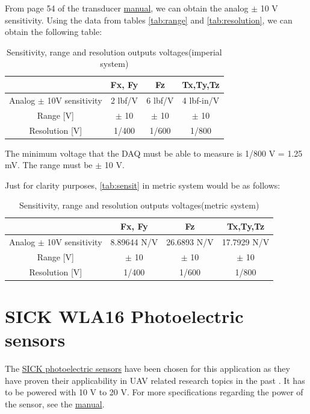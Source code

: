 \documentclass[a4paper]{article}
\begin{document}
From page 54 of the transducer \href{https://www.ati-ia.com/app_content/documents/9620-05-Transducer%20Section.pdf}{manual}, we can obtain the analog $\pm$ 10 V sensitivity. Using the data from tables \ref{tab:range} and \ref{tab:resolution}, we can obtain the following table:

\begin{table}[h!]
	\centering
	\caption{Sensitivity, range and resolution outputs voltages\label{tab:sensit} (imperial system)}
	\begin{tabular}{||c | c | c | c ||} 
		\hline
		 & Fx, Fy & Fz & Tx,Ty,Tz \\ [0.5ex] 
		\hline\hline
		Analog $\pm$ 10V sensitivity & 2 lbf/V & 6 lbf/V & 4 lbf-in/V\\ 
		\hline
		Range [V] & $\pm$ 10 & $\pm$ 10 & $\pm$ 10 \\
		\hline
		Resolution [V] & 1/400 & 1/600 & 1/800 \\
		\hline
	\end{tabular}
\end{table}

The minimum voltage that the DAQ must be able to measure is 1/800 V = 1.25 mV. The range must be $\pm$ 10 V.

Just for clarity purposes, \autoref{tab:sensit} in metric system would be as follows:

\begin{table}[h!]
	\centering
	\caption{Sensitivity, range and resolution outputs voltages\label{tab:sensit2} (metric system)}
	\begin{tabular}{||c | c | c | c ||} 
		\hline
		& Fx, Fy & Fz & Tx,Ty,Tz \\ [0.5ex] 
		\hline\hline
		Analog $\pm$ 10V sensitivity & 8.89644 N/V & 26.6893 N/V & 17.7929 N/V\\ 
		\hline
		Range [V] & $\pm$ 10 & $\pm$ 10 & $\pm$ 10 \\
		\hline
		Resolution [V] & 1/400 & 1/600 & 1/800 \\
		\hline
	\end{tabular}
\end{table}

\section{SICK WLA16 Photoelectric sensors}

The \hyperref{https://www.sick.com/us/en/photoelectric-sensors/photoelectric-sensors/w16/wla16p-24162100a00/p/p512654}{sensors}{SICK}{SICK photoelectric sensors} have been chosen for this application as they have proven their applicability in UAV related research topics in the past \cite{Scanavino2021}. It has to be powered with 10 V to 20 V. For more specifications regarding the power of the sensor, see the \hyperref{https://cdn.sick.com/media/pdf/4/54/654/dataSheet_WLA16P-24162100A00_1218660_en.pdf}{category}{name}{manual}.
\end{document}
